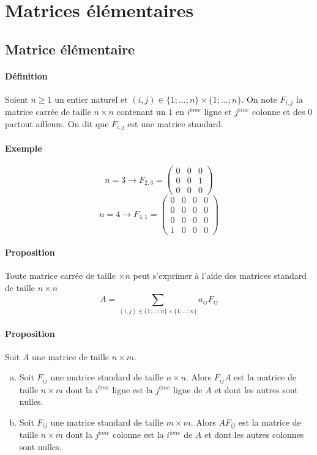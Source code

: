 %
%
\section{Matrices élémentaires}
%
%

%
\subsection{Matrice élémentaire}
%
\paragraph{Définition} Soient $n \geq 1$ un entier naturel et $(i, j) \in \{1; \ldots; n\} \times \{1; \ldots; n\}$. On note $F_{i, j}$ la matrice carrée de taille $n \times n$ contenant un $1$ en $i^{ème}$ ligne et $j^{ème}$ colonne et des $0$ partout ailleurs. On dit que $F_{i, j}$ est une matrice standard.

\paragraph{Exemple} 
$$n = 3 \rightarrow F_{2,3} = 
\begin{pmatrix}
  0 & 0 & 0 \\
  0 & 0 & 1 \\
  0 & 0 & 0
\end{pmatrix}$$
$$n = 4 \rightarrow F_{4,1} = 
\begin{pmatrix}
  0 & 0 & 0 & 0 \\
  0 & 0 & 0 & 0 \\
  0 & 0 & 0 & 0 \\
  1 & 0 & 0 & 0
\end{pmatrix}$$

\paragraph{Proposition} Toute matrice carrée de taille $\times n$ peut s'exprimer à l'aide des matrices standard de taille $n\times n$
$$A = \sum_{(i, j) \in \{1; \ldots; n\}\times\{1; \ldots; n\}} a_{ij} F_{ij}$$

\paragraph{Proposition} Soit $A$ une matrice de taille $n\times m$.
\begin{enumerate}[a)]
  \item Soit $F_{ij}$ une matrice standard de taille $n\times n$. Alors $F_{ij} A$ est la matrice de taille $n \times m$ dont la $i^{ème}$ ligne est la $j^{ème}$ ligne de $A$ et dont les autres sont nulles.
  \item Soit $F_{ij}$ une matrice standard de taille $m\times m$. Alors $A F_{ij}$ est la matrice de taille $n\times m$ dont la $j^{ème}$ colonne est la $i^{ème}$ de $A$ et dont les autres colonnes sont nulles.
\end{enumerate}

